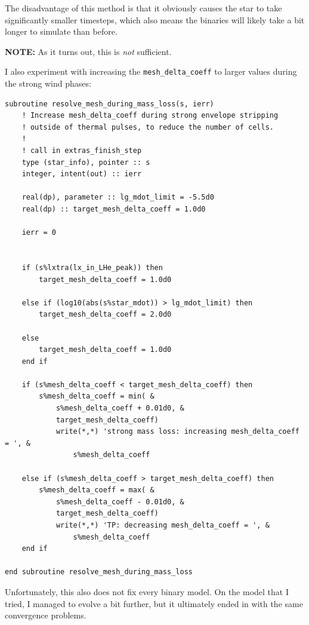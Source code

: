 \documentclass[a4paper,10pt]{article}
\begin{document}
The disadvantage of this method is that it obviously causes the star to take significantly smaller timesteps, which also means the binaries will likely take a bit longer to simulate than before.

\begin{questionbox}{}{}
\textbf{\textcolor{keywordscolor}{NOTE:}}
    As it turns out, this is \emph{not} sufficient. 
\end{questionbox}

I also experiment with increasing the \lstinline[style=output, breaklines=true]|mesh_delta_coeff| to larger values during the strong wind phases:

\begin{verbatim}
subroutine resolve_mesh_during_mass_loss(s, ierr)
    ! Increase mesh_delta_coeff during strong envelope stripping
    ! outside of thermal pulses, to reduce the number of cells.
    !
    ! call in extras_finish_step
    type (star_info), pointer :: s
    integer, intent(out) :: ierr

    real(dp), parameter :: lg_mdot_limit = -5.5d0
    real(dp) :: target_mesh_delta_coeff = 1.0d0

    ierr = 0


    if (s%lxtra(lx_in_LHe_peak)) then
        target_mesh_delta_coeff = 1.0d0
    
    else if (log10(abs(s%star_mdot)) > lg_mdot_limit) then
        target_mesh_delta_coeff = 2.0d0
    
    else
        target_mesh_delta_coeff = 1.0d0
    end if
    
    if (s%mesh_delta_coeff < target_mesh_delta_coeff) then
        s%mesh_delta_coeff = min( &
            s%mesh_delta_coeff + 0.01d0, &
            target_mesh_delta_coeff)
            write(*,*) 'strong mass loss: increasing mesh_delta_coeff = ', &
                s%mesh_delta_coeff
    
    else if (s%mesh_delta_coeff > target_mesh_delta_coeff) then
        s%mesh_delta_coeff = max( &
            s%mesh_delta_coeff - 0.01d0, &
            target_mesh_delta_coeff)
            write(*,*) 'TP: decreasing mesh_delta_coeff = ', &
                s%mesh_delta_coeff
    end if

end subroutine resolve_mesh_during_mass_loss
\end{verbatim}

Unfortunately, this also does not fix every binary model. On the model that I tried, I managed to evolve a bit further, but it ultimately ended in with the same convergence problems.
\end{document}
